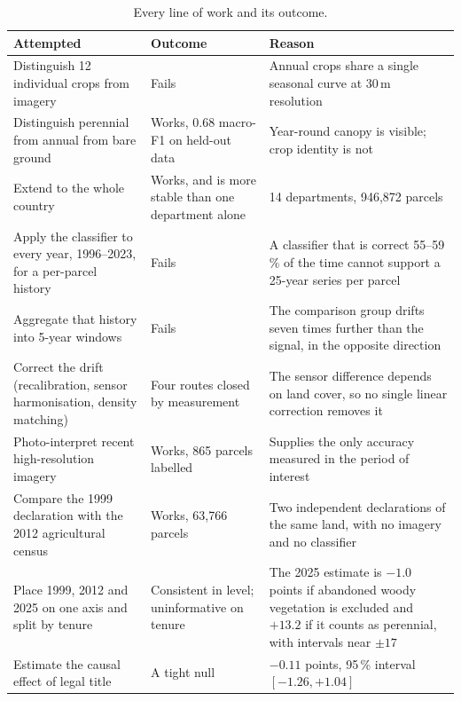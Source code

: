 \documentclass[11pt,a4paper]{article}
\begin{document}
\begin{table}[htbp]
\centering
\small
\caption{Every line of work and its outcome.}
\label{tab:scoreboard}
\begin{tabular}{@{}p{5.0cm}p{4.2cm}p{6.0cm}@{}}
\toprule
\textbf{Attempted} & \textbf{Outcome} & \textbf{Reason} \\
\midrule
Distinguish 12 individual crops from imagery
& Fails
& Annual crops share a single seasonal curve at 30\,m resolution \\[0.4em]

Distinguish perennial from annual from bare ground
& Works, 0.68 macro-F1 on held-out data
& Year-round canopy is visible; crop identity is not \\[0.4em]

Extend to the whole country
& Works, and is more stable than one department alone
& 14 departments, 946{,}872 parcels \\[0.4em]

Apply the classifier to every year, 1996--2023, for a per-parcel history
& Fails
& A classifier that is correct 55--59\,\% of the time cannot support a 25-year series per parcel \\[0.4em]

Aggregate that history into 5-year windows
& Fails
& The comparison group drifts seven times further than the signal, in the opposite direction \\[0.4em]

Correct the drift (recalibration, sensor harmonisation, density matching)
& Four routes closed by measurement
& The sensor difference depends on land cover, so no single linear correction removes it \\[0.4em]

Photo-interpret recent high-resolution imagery
& Works, 865 parcels labelled
& Supplies the only accuracy measured in the period of interest \\[0.4em]

Compare the 1999 declaration with the 2012 agricultural census
& Works, 63{,}766 parcels
& Two independent declarations of the same land, with no imagery and no classifier \\[0.4em]

Place 1999, 2012 and 2025 on one axis and split by tenure
& Consistent in level; uninformative on tenure
& The 2025 estimate is $-1.0$ points if abandoned woody vegetation is excluded and $+13.2$ if it counts as perennial, with intervals near $\pm 17$ \\[0.4em]

Estimate the causal effect of legal title
& A tight null
& $-0.11$ points, 95\,\% interval $[-1.26, +1.04]$ \\
\bottomrule
\end{tabular}
\end{table}
\end{document}
